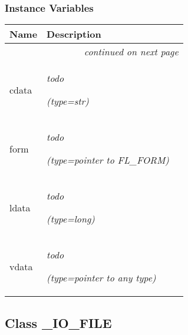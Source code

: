 
  \subsubsection{Instance Variables}

    \vspace{-1cm}
\hspace{\varindent}\begin{longtable}{|p{\varnamewidth}|p{\vardescrwidth}|l}
\cline{1-2}
\cline{1-2} \centering \textbf{Name} & \centering \textbf{Description}& \\
\cline{1-2}
\endhead\cline{1-2}\multicolumn{3}{r}{\small\textit{continued on next page}}\\\endfoot\cline{1-2}
\endlastfoot\raggedright c\-d\-a\-t\-a\- & \raggedright \emph{todo}

            {\it (type=str)}&\\
\cline{1-2}
\raggedright f\-o\-r\-m\- & \raggedright \emph{todo}

            {\it (type=pointer to FL\_FORM)}&\\
\cline{1-2}
\raggedright l\-d\-a\-t\-a\- & \raggedright \emph{todo}

            {\it (type=long)}&\\
\cline{1-2}
\raggedright v\-d\-a\-t\-a\- & \raggedright \emph{todo}

            {\it (type=pointer to any type)}&\\
\cline{1-2}
\end{longtable}



\subsection{Class \_IO\_FILE}

